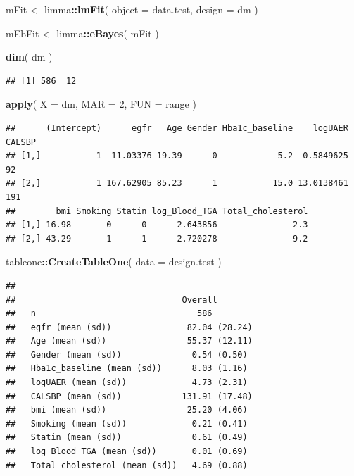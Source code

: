 \documentclass[]{article}
\newenvironment{Shaded}{\begin{snugshade}}{\end{snugshade}}
\newcommand{\DataTypeTok}[1]{\textcolor[rgb]{0.13,0.29,0.53}{#1}}
\newcommand{\DecValTok}[1]{\textcolor[rgb]{0.00,0.00,0.81}{#1}}
\newcommand{\KeywordTok}[1]{\textcolor[rgb]{0.13,0.29,0.53}{\textbf{#1}}}
\newcommand{\NormalTok}[1]{#1}
\newcommand{\OperatorTok}[1]{\textcolor[rgb]{0.81,0.36,0.00}{\textbf{#1}}}
\newcommand{\StringTok}[1]{\textcolor[rgb]{0.31,0.60,0.02}{#1}}
\begin{document}
\begin{Shaded}
\begin{Highlighting}[]
\NormalTok{mFit <-}\StringTok{ }
\StringTok{  }\NormalTok{limma}\OperatorTok{::}\KeywordTok{lmFit}\NormalTok{( }
    \DataTypeTok{object =}\NormalTok{ data.test,}
    \DataTypeTok{design =}\NormalTok{ dm}
\NormalTok{  )}

\NormalTok{mEbFit <-}\StringTok{ }\NormalTok{limma}\OperatorTok{::}\KeywordTok{eBayes}\NormalTok{( mFit )}

\KeywordTok{dim}\NormalTok{( dm )}
\end{Highlighting}
\end{Shaded}

\begin{verbatim}
## [1] 586  12
\end{verbatim}

\begin{Shaded}
\begin{Highlighting}[]
\KeywordTok{apply}\NormalTok{( }\DataTypeTok{X =}\NormalTok{ dm, }\DataTypeTok{MAR =} \DecValTok{2}\NormalTok{, }\DataTypeTok{FUN =}\NormalTok{ range )}
\end{Highlighting}
\end{Shaded}

\begin{verbatim}
##      (Intercept)      egfr   Age Gender Hba1c_baseline    logUAER CALSBP
## [1,]           1  11.03376 19.39      0            5.2  0.5849625     92
## [2,]           1 167.62905 85.23      1           15.0 13.0138461    191
##        bmi Smoking Statin log_Blood_TGA Total_cholesterol
## [1,] 16.98       0      0     -2.643856               2.3
## [2,] 43.29       1      1      2.720278               9.2
\end{verbatim}

\begin{Shaded}
\begin{Highlighting}[]
\NormalTok{tableone}\OperatorTok{::}\KeywordTok{CreateTableOne}\NormalTok{( }\DataTypeTok{data =}\NormalTok{ design.test )}
\end{Highlighting}
\end{Shaded}

\begin{verbatim}
##                                
##                                 Overall       
##   n                                586        
##   egfr (mean (sd))               82.04 (28.24)
##   Age (mean (sd))                55.37 (12.11)
##   Gender (mean (sd))              0.54 (0.50) 
##   Hba1c_baseline (mean (sd))      8.03 (1.16) 
##   logUAER (mean (sd))             4.73 (2.31) 
##   CALSBP (mean (sd))            131.91 (17.48)
##   bmi (mean (sd))                25.20 (4.06) 
##   Smoking (mean (sd))             0.21 (0.41) 
##   Statin (mean (sd))              0.61 (0.49) 
##   log_Blood_TGA (mean (sd))       0.01 (0.69) 
##   Total_cholesterol (mean (sd))   4.69 (0.88)
\end{verbatim}
\end{document}
